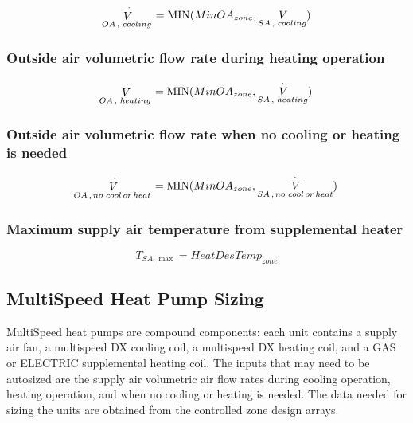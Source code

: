 \begin{equation}
{\mathop V\limits^ \cdot_{OA\,,\,\,cooling}} = {\rm{MIN}}(MinO{A_{zone}},{\mathop {\,V}\limits^ \cdot_{SA\,,\,\,cooling}})
\end{equation}

\subsubsection{Outside air volumetric flow rate during heating operation}\label{outside-air-volumetric-flow-rate-during-heating-operation}

\begin{equation}
{\mathop V\limits^ \cdot_{OA\,,\,\,heating}} = {\rm{MIN}}(MinO{A_{zone}},{\mathop {\,V}\limits^ \cdot_{SA\,,\,\,heating}})
\end{equation}

\subsubsection{Outside air volumetric flow rate when no cooling or heating is needed}\label{outside-air-volumetric-flow-rate-when-no-cooling-or-heating-is-needed}

\begin{equation}
{\mathop V\limits^ \cdot_{OA\,,\,no\,\,cool\,or\,heat}} = {\rm{MIN}}(MinO{A_{zone}},{\mathop {\,V}\limits^ \cdot_{SA\,,\,no\,\,cool\,or\,heat}})
\end{equation}

\subsubsection{Maximum supply air temperature from supplemental heater}\label{maximum-supply-air-temperature-from-supplemental-heater}

\begin{equation}
{T_{SA,\max }} = HeatDesTem{p_{zone}}
\end{equation}

\subsection{MultiSpeed Heat Pump Sizing}\label{multispeed-heat-pump-sizing}

MultiSpeed heat pumps are compound components: each unit contains a supply air fan, a multispeed DX cooling coil, a multispeed DX heating coil, and a GAS or ELECTRIC supplemental heating coil. The inputs that may need to be autosized are the supply air volumetric air flow rates during cooling operation, heating operation, and when no cooling or heating is needed. The data needed for sizing the units are obtained from the controlled zone design arrays.

